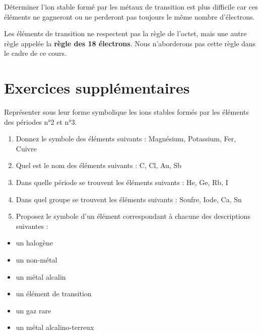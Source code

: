 \documentclass[
  11pt,
  french,
  a4paper,
  openany]{book}
\providecommand{\tightlist}{%
  \setlength{\itemsep}{0pt}\setlength{\parskip}{0pt}}
\begin{document}
Déterminer l'ion stable formé par les métaux de transition est plus difficile car ces éléments ne gagneront ou ne perderont pas toujours le même nombre d'électrons.

Les éléments de transition ne respectent pas la règle de l'octet, mais une autre règle appelée la \textbf{règle des 18 électrons}. Nous n'aborderons pas cette règle dans le cadre de ce cours.

\newpage

\hypertarget{exercices-suppluxe9mentaires-4}{%
\section{Exercices supplémentaires}\label{exercices-suppluxe9mentaires-4}}

\begin{Exercise}

Représenter sous leur forme symbolique les ions stables formés par les éléments des périodes n°2 et n°3.

\begin{enumerate}
\def\labelenumi{\arabic{enumi}.}
\tightlist
\item
  Donnez le symbole des éléments suivants :
  Magnésium, Potassium, Fer, Cuivre\\
\item
  Quel est le nom des éléments suivants :
  C, Cl, Au, Sb\\
\item
  Dans quelle période se trouvent les éléments suivants :
  He, Ge, Rb, I\\
\item
  Dans quel groupe se trouvent les éléments suivants :
  Soufre, Iode, Ca, Sn\\
\item
  Proposez le symbole d'un élément correspondant à chacune des descriptions suivantes :
\end{enumerate}

\begin{itemize}
\tightlist
\item
  un halogène
\item
  un non-métal
\item
  un métal alcalin
\item
  un élément de transition
\item
  un gaz rare
\item
  un métal alcalino-terreux
\end{itemize}


\end{Exercise}
\end{document}
